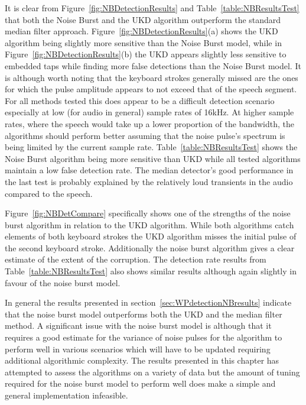 It is clear from Figure~\ref{fig:NBDetectionResults} and Table~\ref{table:NBResultsTest} that both the Noise Burst and the UKD algorithm outperform the standard median filter approach. Figure~\ref{fig:NBDetectionResults}(a) shows the UKD algorithm being slightly more sensitive than the Noise Burst model, while in Figure~\ref{fig:NBDetectionResults}(b) the UKD appears slightly less sensitive to embedded taps while finding more false detections than the Noise Burst model. It is although worth noting that the keyboard strokes generally missed are the ones for which the pulse amplitude appears to not exceed that of the speech segment. For all methods tested this does appear to be a difficult detection scenario especially at low (for audio in general) sample rates of 16kHz. At higher sample rates, where the speech would take up a lower proportion of the bandwidth, the algorithms should perform better assuming that the noise pulse's spectrum is being limited by the current sample rate. Table~\ref{table:NBResultsTest} shows the Noise Burst algorithm being more sensitive than UKD while all tested algorithms maintain a low false detection rate. The median detector's good performance in the last test is probably explained by the relatively loud transients in the audio compared to the speech.

Figure~\ref{fig:NBDetCompare} specifically shows one of the strengths of the noise burst algorithm in relation to the UKD algorithm. While both algorithms catch elements of both keyboard strokes the UKD algorithm misses the initial pulse of the second keyboard stroke. Additionally the noise burst algorithm gives a clear estimate of the extent of the corruption. The detection rate results from Table~\ref{table:NBResultsTest} also shows similar results although again slightly in favour of the noise burst model.

In general the results presented in section~\ref{sec:WPdetectionNBresults} indicate that the noise burst model outperforms both the UKD and the median filter method. A significant issue with the noise burst model is although that it requires a good estimate for the variance of noise pulses for the algorithm to perform well in various scenarios which will have to be updated requiring additional algorithmic complexity. The results presented in this chapter has attempted to assess the algorithms on a variety of data but the amount of tuning required for the noise burst model to perform well does make a simple and general implementation infeasible.

